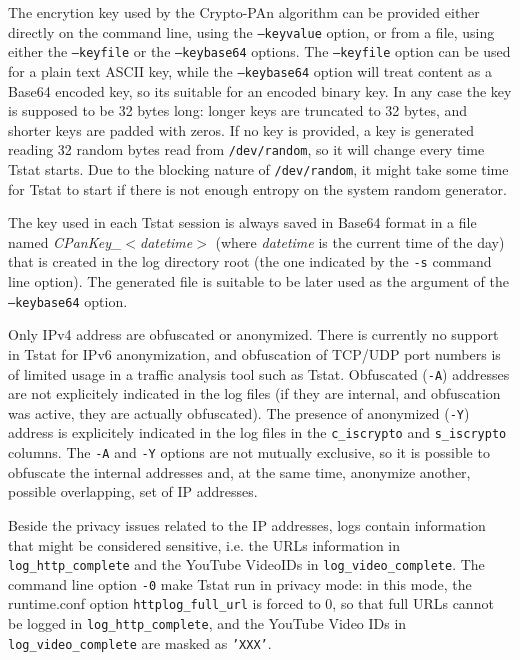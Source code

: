 \documentclass[11pt]{article}
\begin{document}
The encrytion key used by the Crypto-PAn algorithm can be provided either directly on 
the command line, using the \texttt{--keyvalue} option, or from a file, using 
either the \texttt{--keyfile} or the \texttt{--keybase64} options. The \texttt{--keyfile} option
can be used for a plain text ASCII key, while the \texttt{--keybase64} option will treat 
content as a Base64 encoded key, so its suitable for an encoded binary key. In any case
the key is supposed to be 32 bytes long: longer keys are truncated to 32 bytes, and 
shorter keys are padded with zeros. If no key is provided, a key is generated reading 
32 random bytes read from \texttt{/dev/random}, so it will change every time Tstat starts.
Due to the blocking nature of \texttt{/dev/random}, it might take some time for Tstat to
start if there is not enough entropy on the system random generator.



The key used in each Tstat session is always saved in Base64 format in a file named 
\emph{CPanKey\_$<$datetime}$>$  (where \textit{datetime} is the current time of the day) that is 
created in the log directory root (the one indicated by the \texttt{-s} command line option).
The generated file is suitable to be later used as the argument of the \texttt{--keybase64} 
option.



Only IPv4 address are obfuscated or anonymized. There is currently no support in Tstat
for IPv6 anonymization, and obfuscation of TCP/UDP port numbers is of limited usage in
a traffic analysis tool such as Tstat.
Obfuscated (\texttt{-A}) addresses are not explicitely indicated in the log files (if they are
internal, and obfuscation was active, they are actually obfuscated). The presence of 
anonymized (\texttt{-Y}) address is explicitely indicated in the log files in the \texttt{c\_iscrypto}
and \texttt{s\_iscrypto} columns.
The \texttt{-A} and \texttt{-Y} options are not mutually exclusive, so it is possible to obfuscate the
internal addresses and, at the same time, anonymize another, possible overlapping, set of
IP addresses.



Beside the privacy issues related to the IP addresses, logs contain information that 
might be considered sensitive, i.e. the URLs information in \texttt{log\_http\_complete} and 
the YouTube VideoIDs in \texttt{log\_video\_complete}. The command line option \texttt{-0} make Tstat 
run in privacy mode: in this mode, the runtime.conf option \texttt{httplog\_full\_url} is forced 
to 0, so that full URLs cannot be logged in \texttt{log\_http\_complete}, and the YouTube 
Video IDs in \texttt{log\_video\_complete} are masked as \texttt{'XXX'}.
\end{document}
